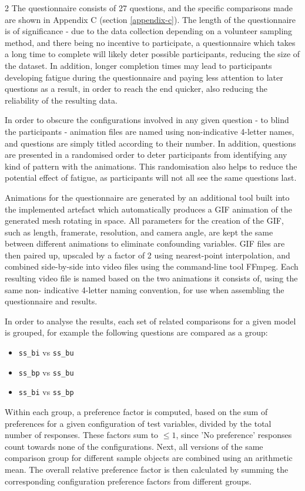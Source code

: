 \documentclass[]{article}
\providecommand{\tightlist}{%
  \setlength{\itemsep}{0pt}\setlength{\parskip}{0pt}}
\begin{document}
\begin{multicols}{2}
The questionnaire consists of 27 questions, and the specific comparisons made are shown in Appendix C (section \ref{appendix-c}). The length of the questionnaire is of significance - due to the data collection depending on a volunteer sampling method, and there being no incentive to participate, a questionnaire which takes a long time to complete will likely deter possible  participants, reducing the size of the dataset. In addition, longer completion times may lead to participants developing fatigue during the questionnaire and paying less attention to later questions as a result, in order to reach the end quicker, also reducing the reliability of the resulting data.

In order to obscure the configurations involved in any given question - to blind the participants - animation files are named using non-indicative 4-letter names, and questions are simply titled according to their number. In addition, questions are presented in a randomised order to deter participants from identifying any kind of pattern with the animations. This randomisation also helps to reduce the potential effect of fatigue, as participants will not all see the same questions last.

Animations for the questionnaire are generated by an additional tool built into the implemented artefact which automatically produces a GIF animation of the generated mesh rotating in space. All parameters for the creation of the GIF, such as length, framerate, resolution, and camera angle, are kept the same between different animations to eliminate confounding variables. GIF files are then paired up, upscaled by a factor of 2 using nearest-point interpolation, and combined side-by-side into video files using the command-line tool FFmpeg. Each resulting video file is named based on the two animations it consists of, using the same non- indicative 4-letter naming convention, for use when assembling the questionnaire and results.

In order to analyse the results, each set of related comparisons for a given model is grouped, for example the following questions are compared as a group:
\begin{itemize}
\tightlist
\item \verb+ss_bi+ vs \verb+ss_bu+
\item \verb+ss_bp+ vs \verb+ss_bu+
\item \verb+ss_bi+ vs \verb+ss_bp+
\end{itemize}
Within each group, a preference factor is computed, based on the sum of preferences for a given configuration of test variables, divided by the total number of responses. These factors sum to $\leq 1$, since 'No preference' responses count towards none of the configurations. Next, all versions of the same comparison group for different sample objects are combined using an arithmetic mean. The overall relative preference factor is then calculated by summing the corresponding configuration preference factors from different groups.


\end{multicols}
\end{document}
